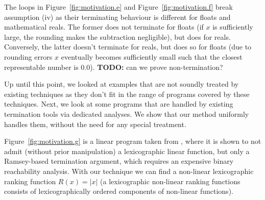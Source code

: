 \documentclass[preprint]{sigplanconf}
\theoremstyle{definition}
\newcommand{\todo}[1]{{\bf TODO:} #1}
\begin{document}
The loops in Figure~\ref{fig:motivation.e} and Figure~\ref{fig:motivation.f} break assumption (iv) as their terminating behaviour is different 
for floats and mathematical reals. 
The former does not terminate for floats (if $x$ is sufficiently large, the rounding makes the subtraction negligible), but does for reals. Conversely, the latter 
doesn't terminate for reals, but does so for floats (due to rounding errors $x$ eventually becomes sufficiently small 
such that the closest representable number is 0.0). \todo{can we prove non-termination?}


Up until this point, we looked at examples that are not soundly treated by existing techniques as they 
don't fit in the range of programs covered by these techniques.
Next, we look at some programs that are handled by existing termination tools via dedicated analyses. We show that our method 
uniformly handles them, without the need for any special treatment.




Figure~\ref{fig:motivation.g} is a linear program taken from \cite{DBLP:conf/tacas/CookSZ13}, 
where it is shown to not admit (without prior manipulation) a lexicographic linear function, but only a Ramsey-based termination argument,
which requires an expensive binary reachability analysis.
With our technique we can find a non-linear lexicographic ranking function $R(x) = |x|$ 
(a lexicographic non-linear ranking functions consists of lexicographically ordered components
of non-linear functions). 
\end{document}
